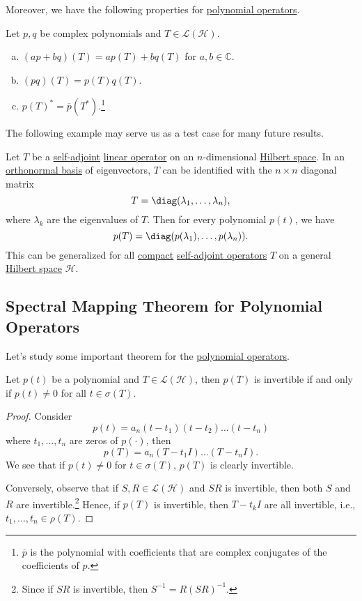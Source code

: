 Moreover, we have the following properties for \hyperref[def:polynomial-op]{polynomial operators}.

\begin{proposition}\label{prop:polynomial-op}
	Let \(p, q\) be complex polynomials and \(T\in \mathcal{L} (\mathcal{H} )\).
	\begin{enumerate}[(a)]
		\item \((ap + bq)(T) = ap(T) + bq(T)\) for \(a, b\in \mathbb{C} \).
		\item \((pq)(T) = p(T) q(T)\).
		\item \(p(T)^{\ast} = \overline{p} (T^{\ast} )\).\footnote{\(\overline{p} \) is the polynomial with coefficients that are complex conjugates of the coefficients of \(p\).}
	\end{enumerate}
\end{proposition}

The following example may serve us as a test case for many future results.

\begin{eg}
	Let \(T\) be a \hyperref[def:self-adjoint-op]{self-adjoint} \hyperref[def:linear-op]{linear operator} on an \(n\)-dimensional \hyperref[def:Hilbert-space]{Hilbert space}. In an \hyperref[def:orthonormal-basis]{orthonormal basis} of eigenvectors, \(T\) can be identified with the \(n \times n\) diagonal matrix
	\[
		T = \diag (\lambda _1, \dots , \lambda _n),
	\]
	where \(\lambda _k\) are the eigenvalues of \(T\). Then for every polynomial \(p(t)\), we have
	\[
		p(T) = \diag (p(\lambda _1), \dots  , p(\lambda _n)).
	\]
	This can be generalized for all \hyperref[def:compact-op]{compact} \hyperref[def:self-adjoint-op]{self-adjoint operators} \(T\) on a general \hyperref[def:Hilbert-space]{Hilbert space} \(\mathcal{H} \).
\end{eg}

\subsection{Spectral Mapping Theorem for Polynomial Operators}
Let's study some important theorem for the \hyperref[def:polynomial-op]{polynomial operators}.

\begin{lemma}\label{lma:invertibility-for-polynomial-op}
	Let \(p(t)\) be a polynomial and \(T\in \mathcal{L} (\mathcal{H} )\), then \(p(T)\) is invertible if and only if \(p(t) \neq 0\) for all \(t\in \sigma (T)\).
\end{lemma}
\begin{proof}
	Consider
	\[
		p(t) = a_n (t-t_1)(t-t_2)\dots  (t-t_n)
	\]
	where \(t_1, \dots  , t_n\) are zeros of \(p(\cdot)\), then
	\[
		p(T) = a_n (T-t_1 I)\dots  (T-t_n I).
	\]
	We see that if \(p(t) \neq 0\) for \(t\in \sigma (T)\), \(p(T)\) is clearly invertible.

	Conversely, observe that if \(S, R\in \mathcal{L} (\mathcal{H} )\) and \(SR\) is invertible, then both \(S\) and \(R\) are invertible.\footnote{Since if \(SR\) is invertible, then \(S^{-1} = R(SR)^{-1} \).} Hence, if \(p(T)\) is invertible, then \(T - t_k I\) are all invertible, i.e., \(t_1, \dots  , t_n\in \rho (T)\).
\end{proof}

